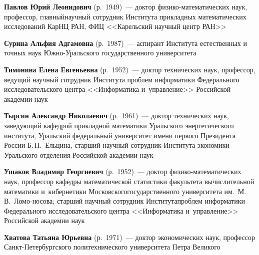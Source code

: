 \begin{multicols}{2}
\vspace*{3pt}

 \noindent
\textbf{Павлов Юрий Леонидович} (р.\ 1949)~--- доктор 
фи\-зи\-ко-ма\-те\-ма\-ти\-че\-ских наук, 
профессор, глав\-ный\linebreak научный со\-труд\-ник Института прикладных математических 
исследований КарНЦ РАН, ФИЦ <<Карельский научный центр РАН>>





\vspace*{3pt}

\noindent
\textbf{Сурина Альфия Адгамовна} (р.\ 1987)~--- 
аспирант Института естественных и точных наук 
Юж\-но-Ураль\-ско\-го государственного университета
 
\vspace*{3pt}

\noindent
\textbf{Тимонина Елена Евгеньевна} (р.\ 1952)~--- 
доктор технических наук, профессор, ведущий научный сотруд\-ник Института проб\-лем 
информатики Федерального исследовательского центра <<Информатика и~управ\-ле\-ние>> 
Российской академии наук

\vspace*{3pt}

\noindent
\textbf{Тырсин Александр Николаевич} (р.\ 1961)~--- 
доктор технических наук, заведующий кафедрой прикладной 
математики Уральского энергетического института, 
Уральский федеральный университет имени первого Президента России 
Б.\,Н.~Ельцина,  старший научный сотрудник Института 
экономики Уральского отделения Российской академии наук

\vspace*{3pt}

\noindent
\textbf{Ушаков Владимир Георгиевич} (р.\ 1952)~--- 
доктор фи\-зи\-ко-ма\-те\-ма\-ти\-че\-ских наук, профессор кафедры 
математической статистики факультета вычислительной математики 
и~кибернетики Московского\linebreak государственного университета им.\ М.\,В.~Ло\-мо-\linebreak носова; 
старший научный сотрудник Института\linebreak проб\-лем информатики Федерального 
исследовательского центра <<Информатика и~управ\-ле\-ние>> Российской академии наук

\vspace*{3pt}

\noindent
\textbf{Хватова Татьяна Юрьевна} (р.\ 1971)~--- 
доктор экономических наук, профессор Санкт-Пе\-тер\-бург\-ско\-го 
политехнического университета Петра Великого


\end{multicols}
